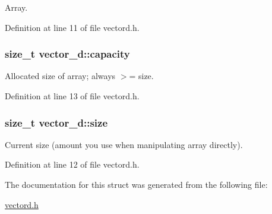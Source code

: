\-Array. 



\-Definition at line 11 of file vectord.\-h.

\hypertarget{structvector__d_a83fb5c9689de179f0dfe1413d720cdc3}{
\subsubsection[{capacity}]{\setlength{\rightskip}{0pt plus 5cm}size\-\_\-t {\bf vector\-\_\-d\-::capacity}}}\label{structvector__d_a83fb5c9689de179f0dfe1413d720cdc3}


\-Allocated size of array; always $>$= size. 



\-Definition at line 13 of file vectord.\-h.

\hypertarget{structvector__d_a1a8bccf26d9cef41fd453f6feb2f15b1}{
\subsubsection[{size}]{\setlength{\rightskip}{0pt plus 5cm}size\-\_\-t {\bf vector\-\_\-d\-::size}}}\label{structvector__d_a1a8bccf26d9cef41fd453f6feb2f15b1}


\-Current size (amount you use when manipulating array directly). 



\-Definition at line 12 of file vectord.\-h.



\-The documentation for this struct was generated from the following file\-:\begin{DoxyCompactItemize}
\item 
\hyperlink{vectord_8h}{vectord.\-h}\end{DoxyCompactItemize}

